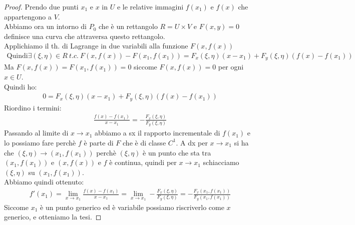\documentclass[a4paper, oneside]{article}
\begin{document}
\begin{proof}
    Prendo due punti $x_1$ e $x$ in $U$ e le relative immagini $f(x_1)$ e $f(x)$ che appartengono a $V$.\\
    Abbiamo ora un intorno di $P_0$ che è un rettangolo $R = U \times V$ e $F(x,y) = 0$ definisce una curva che attraversa questo rettangolo.\\
    Applichiamo il th. di Lagrange in due variabili alla funzione $F(x, f(x))$
    \begin{gather*}
        \text{Quindi} \exists (\xi, \eta) \in R \ t.c. \ F(x,f(x)) - F(x_1,f(x_1)) = F_x(\xi, \eta)(x-x_1) + F_y(\xi, \eta)(f(x)-f(x_1))
    \end{gather*}
    Ma $F(x,f(x)) = F(x_1,f(x_1)) = 0$ siccome $F(x,f(x)) = 0$ per ogni $x \in U$.\\
    Quindi ho:
    \begin{gather*}
        0 = F_x(\xi, \eta)(x-x_1) + F_y(\xi, \eta)(f(x)-f(x_1))
    \end{gather*}
    Riordino i termini:
    \begin{gather*}
        \frac{f(x)-f(x_1)}{x-x_1} = -\frac{F_x(\xi, \eta)}{F_y(\xi, \eta)}
    \end{gather*}
    Passando al limite di $x \to x_1$ abbiamo a sx il rapporto incrementale di $f(x_1)$ e lo possiamo fare perchè $f$ è parte di $F$ che è di classe $C^1$.
    A dx per $x \to x_1$ si ha che $(\xi,\eta) \to (x_1,f(x_1))$ perchè $(\xi, \eta)$ è un punto che sta tra $(x_1,f(x_1))$ e $(x,f(x))$ e $f$ è continua, quindi per $x \to x_1$ schiacciamo $(\xi, \eta)$ su $(x_1,f(x_1))$.\\
    Abbiamo quindi ottenuto:
    \begin{gather*}
        f'(x_1) = \lim_{x \to x_1} \frac{f(x)-f(x_1)}{x-x_1} = \lim_{x \to x_1} -\frac{F_x(\xi, \eta)}{F_y(\xi, \eta)} = -\frac{F_x(x_1,f(x_1))}{F_y(x_1,f(x_1))}
    \end{gather*}
    Siccome $x_1$ è un punto generico ed è variabile possiamo riscriverlo come $x$ generico, e otteniamo la tesi.

\end{proof}
\end{document}
